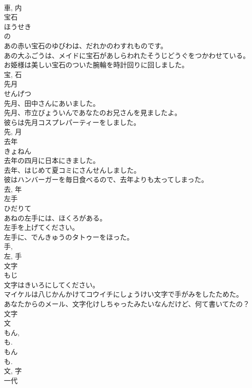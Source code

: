 \documentclass[8pt]{extreport}
\begin{document}
\begin{CJK}{UTF8}{min}
\\	車, 内	
\\	宝石	
\\	ほうせき	
\\	の 
\\	あの赤い宝石のゆびわは、だれかのわすれものです。	
\\	あの大ふごうは、メイドに宝石があしらわれたそうじどうぐをつかわせている。	
\\	お姫様は美しい宝石のついた腕輪を時計回りに回しました。	
\\	宝, 石	
\\	先月	
\\	せんげつ	
\\	先月、田中さんにあいました。	
\\	先月、市立びょういんであなたのお兄さんを見ましたよ。	
\\	彼らは先月コスプレパーティーをしました。	
\\	先, 月	
\\	去年	
\\	きょねん	
\\	去年の四月に日本にきました。	
\\	去年、はじめて夏コミにさんせんしました。	
\\	彼はハンバーガーを毎日食べるので、去年よりも太ってしまった。	
\\	去, 年	
\\	左手	
\\	ひだりて	
\\	あねの左手には、ほくろがある。	
\\	左手を上げてください。	
\\	左手に、でんきゅうのタトゥーをほった。	
\\	手, 
\\	左, 手	
\\	文字	
\\	もじ	
\\	文字はきいろにしてください。	
\\	マイケルは八じかんかけてコウイチにしょうけい文字で手がみをしたためた。	
\\	あなたからのメール、文字化けしちゃったみたいなんだけど、何て書いてたの？	
\\	文字 
\\	文 
\\	もん, 
\\	も. 
\\	もん 
\\	も.
\\	文, 字	
\\	一代	

\end{CJK}
\end{document}
